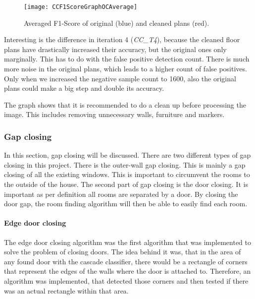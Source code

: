 \begin{figure}[H]
	\centering
	\texttt{[image: CCF1ScoreGraphOCAverage]}
	\caption{Averaged F1-Score of original (blue) and cleaned plans (red).}
	\label{fig:CCF1ScoreGraphOCAverage}
\end{figure}

Interesting is the difference in iteration 4 (\textit{CC\_T4}), because the cleaned floor plans have drastically increased their accuracy, but the original ones only marginally. This has to do with the false positive detection count. There is much more noise in the original plans, which leads to a higher count of false positives. Only when we increased the negative sample count to 1600, also the original plans could make a big step and double its accuracy.

The graph shows that it is recommended to do a clean up before processing the image. This includes removing unnecessary walls, furniture and markers.


\subsubsection{Gap closing}
\label{sub:GapClosing}
In this section, gap closing will be discussed. There are two different types of gap closing in this project. There is the outer-wall gap closing. This is mainly a gap closing of all the existing windows. This is important to circumvent the rooms to the outside of the house. The second part of gap closing is the door closing. It is important as per definition all rooms are separated by a door. By closing the door gap, the room finding algorithm will then be able to easily find each room.
\paragraph{Edge door closing}
The edge door closing algorithm was the first algorithm that was implemented to solve the problem of closing doors. The idea behind it was, that in the area of any found door with the cascade classifier, there would be a rectangle of corners that represent the edges of the walls where the door is attached to. Therefore, an algorithm was implemented, that detected those corners and then tested if there was an actual rectangle within that area.

